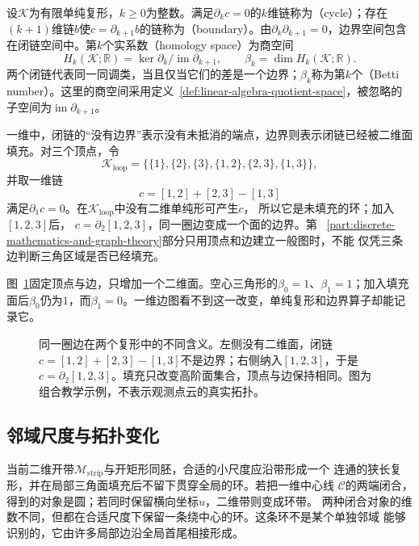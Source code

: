 \begin{definition}[闭链、边界与同调空间]
\label{def:geometry-homology-space}
设$\mathcal K$为有限单纯复形，$k\geq0$为整数。满足$\partial_kc=0$的$k$维链称为（cycle）；存在$(k+1)$维链$b$使$c=\partial_{k+1}b$的链称为（boundary）。由$\partial_k\partial_{k+1}=0$，边界空间包含在闭链空间中。第$k$个实系数（homology space）为商空间
\[
 H_k(\mathcal K;\mathbb R)
 =\ker\partial_k/\operatorname{im}\partial_{k+1},\qquad
 \beta_k=\dim H_k(\mathcal K;\mathbb R).
\]
两个闭链代表同一同调类，当且仅当它们的差是一个边界；$\beta_k$称为第$k$个（Betti number）。这里的商空间采用定义~\ref{def:linear-algebra-quotient-space}，被忽略的子空间为$\operatorname{im}\partial_{k+1}$。
\end{definition}

一维中，闭链的“没有边界”表示没有未抵消的端点，边界则表示闭链已经被二维面填充。对三个顶点，令
\[
  \mathcal{K}_{\mathrm{loop}}
  =
  \{\{1\},\{2\},\{3\},
    \{1,2\},\{2,3\},\{1,3\}\},
\]
并取一维链
\[
  c=[1,2]+[2,3]-[1,3]
\]
满足$\partial_1c=0$。在$\mathcal{K}_{\mathrm{loop}}$中没有二维单纯形可产生$c$，
所以它是未填充的环；加入$[1,2,3]$后，
$c=\partial_2[1,2,3]$，同一圈边变成一个面的边界。第
~\ref{part:discrete-mathematics-and-graph-theory}部分只用顶点和边建立一般图时，不能
仅凭三条边判断三角区域是否已经填充。

图~\ref{fig:geometry-cycle-filled-simplex}固定顶点与边，只增加一个二维面。空心三角形的$\beta_0=1$、$\beta_1=1$；加入填充面后$\beta_0$仍为$1$，而$\beta_1=0$。一维边图看不到这一改变，单纯复形和边界算子却能记录它。

\begin{figure}[htbp]
 \centering
 
 \caption{同一圈边在两个复形中的不同含义。左侧没有二维面，闭链$c=[1,2]+[2,3]-[1,3]$不是边界；右侧纳入$[1,2,3]$，于是$c=\partial_2[1,2,3]$。填充只改变高阶面集合，顶点与边保持相同。图为组合教学示例，不表示观测点云的真实拓扑。}
 \label{fig:geometry-cycle-filled-simplex}
\end{figure}

\subsection{邻域尺度与拓扑变化}

当前二维开带$\mathcal{M}_{\mathrm{strip}}$与开矩形同胚，合适的小尺度应沿带形成一个
连通的狭长复形，并在局部三角面填充后不留下贯穿全局的环。若把一维中心线
$\mathcal{C}$的两端闭合，得到的对象是圆；若同时保留横向坐标$u$，二维带则变成环带。
两种闭合对象的维数不同，但都在合适尺度下保留一条绕中心的环。这条环不是某个单独邻域
能够识别的，它由许多局部边沿全局首尾相接形成。

